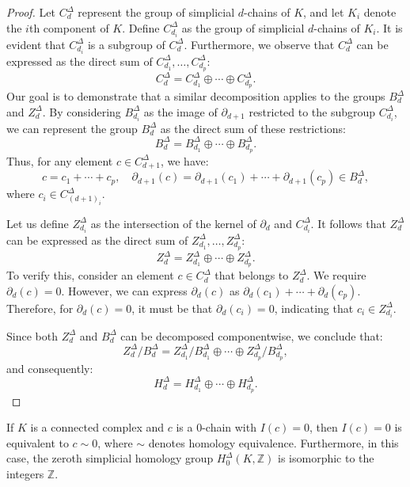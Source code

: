 \begin{proof}
	Let $C^{\Delta}_{d}$ represent the group of simplicial $d$-chains of $K$, and
	let $K_{i}$ denote the $i$th component of $K$. Define $C^{\Delta}_{d_i}$ as
	the group of simplicial $d$-chains of $K_{i}$. It is evident that $C^{\Delta}_{d_i}$
	is a subgroup of $C^{\Delta}_{d}$. Furthermore, we observe that $C^{\Delta}_{d}$
	can be expressed as the direct sum of $C^{\Delta}_{d_1}, \ldots, C^{\Delta}_{d_p}$:
	\[
		C^{\Delta}_{d} = C^{\Delta}_{d_1}\oplus \cdots \oplus C^{\Delta}_{d_p}.
	\]
	Our goal is to demonstrate that a similar decomposition applies to the groups
	$B^{\Delta}_{d}$ and $Z^{\Delta}_{d}$. By considering $B^{\Delta}_{d_i}$ as the
	image of $\partial_{d+1}$ restricted to the subgroup $C^{\Delta}_{d_i}$, we
	can represent the group $B^{\Delta}_{d}$ as the direct sum of these
	restrictions:
	\[
		B^{\Delta}_{d} = B^{\Delta}_{d_1}\oplus \cdots \oplus B^{\Delta}_{d_p}.
	\]
	Thus, for any element $c \in C^{\Delta}_{d+1}$, we have:
	\[
		c = c_{1} + \cdots + c_{p}, \quad \partial_{d+1}(c) = \partial_{d+1}(c_{1}) +
		\cdots + \partial_{d+1}(c_{p}) \in B^{\Delta}_{d},
	\]
	where $c_{i} \in C^{\Delta}_{(d+1)_i}$.

	Let us define $Z^{\Delta}_{d_i}$ as the intersection of the kernel of
	$\partial_{d}$ and $C^{\Delta}_{d_i}$. It follows that $Z^{\Delta}_{d}$ can be
	expressed as the direct sum of $Z^{\Delta}_{d_1}, \ldots, Z^{\Delta}_{d_p}$:
	\[
		Z^{\Delta}_{d} = Z^{\Delta}_{d_1}\oplus \cdots \oplus Z^{\Delta}_{d_p}.
	\]
	To verify this, consider an element $c \in C^{\Delta}_{d}$ that belongs to $Z^{\Delta}
	_{d}$. We require $\partial_{d}(c) = 0$. However, we can express
	$\partial_{d}(c)$ as $\partial_{d}(c_{1}) + \cdots + \partial_{d}(c_{p})$. Therefore,
	for $\partial_{d}(c) = 0$, it must be that $\partial_{d}(c_{i}) = 0$,
	indicating that $c_{i} \in Z^{\Delta}_{d_i}$.

	Since both $Z^{\Delta}_{d}$ and $B^{\Delta}_{d}$ can be decomposed
	componentwise, we conclude that:
	\[
		Z^{\Delta}_{d} / B^{\Delta}_{d} = Z^{\Delta}_{d_1}/ B^{\Delta}_{d_1}\oplus \cdots
		\oplus Z^{\Delta}_{d_p}/ B^{\Delta}_{d_p},
	\]
	and consequently:
	\[
		H^{\Delta}_{d} = H^{\Delta}_{d_1}\oplus \cdots \oplus H^{\Delta}_{d_p}.
	\]
\end{proof}

\begin{proposition}
	\label{decomposition} If $K$ is a connected complex and $c$ is a $0$-chain with
	$I(c) = 0$, then $I(c) = 0$ is equivalent to $c \sim 0$, where $\sim$ denotes homology
	equivalence. Furthermore, in this case, the zeroth simplicial homology group
	$H^{\Delta}_{0}(K, \mathbb{Z})$ is isomorphic to the integers $\mathbb{Z}$.
\end{proposition}

